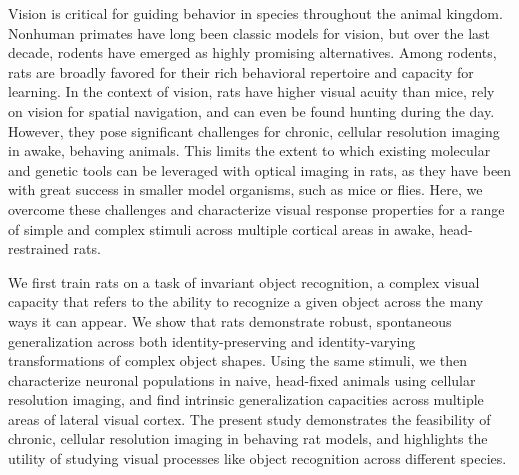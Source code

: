 
Vision is critical for guiding behavior in species throughout the animal kingdom. Nonhuman primates have long been classic models for vision, but over the last decade, rodents have emerged as highly promising alternatives. Among rodents, rats are broadly favored for their rich behavioral repertoire and capacity for learning. In the context of vision, rats have higher visual acuity than mice, rely on vision for spatial navigation, and can even be found hunting during the day. However, they pose significant challenges for chronic, cellular resolution imaging in awake, behaving animals. This limits the extent to which existing molecular and genetic tools can be leveraged with optical imaging in rats, as they have been with great success in smaller model organisms, such as mice or flies. Here, we overcome these challenges and characterize visual response properties for a range of simple and complex stimuli across multiple cortical areas in awake, head-restrained rats. 

We first train rats on a task of invariant object recognition, a complex visual capacity that refers to the ability to recognize a given object across the many ways it can appear. We show that rats demonstrate robust, spontaneous generalization across both identity-preserving and identity-varying transformations of complex object shapes. Using the same stimuli, we then characterize neuronal populations in naive, head-fixed animals using cellular resolution imaging, and find intrinsic generalization capacities across multiple areas of lateral visual cortex. The present study demonstrates the feasibility of chronic, cellular resolution imaging in behaving rat models, and highlights the utility of studying visual processes like object recognition across different species.
